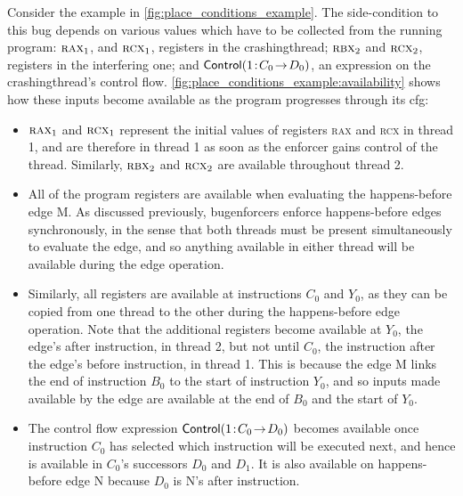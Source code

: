 Consider the example in \autoref{fig:place_conditions_example}.  The
side-condition to this bug depends on various values which have to be
collected from the running program: $\textsc{rax}_1$, and
$\textsc{rcx}_1$, registers in the \gls{crashingthread};
$\textsc{rbx}_2$ and $\textsc{rcx}_2$, registers in the interfering
one; and ${\mathsf{Control}}(\mathrm{1}\!:\!C_0\!\rightarrow\!D_0)$, an expression on the
\gls{crashingthread}'s control flow.
\autoref{fig:place_conditions_example:availability} shows how these
inputs become available as the program progresses through its
\gls{cfg}:
\begin{itemize}
\item $\textsc{rax}_1$ and $\textsc{rcx}_1$ represent the initial
  values of registers \textsc{rax} and \textsc{rcx} in thread 1, and
  are therefore in thread 1 as soon as the enforcer gains control of
  the thread.  Similarly, $\textsc{rbx}_2$ and $\textsc{rcx}_2$ are
  available throughout thread 2.
\item All of the program registers are available when evaluating the
  happens-before edge M.  As discussed previously, {\technique}
  \glspl{bugenforcer} enforce happens-before edges synchronously, in
  the sense that both threads must be present simultaneously to
  evaluate the edge, and so anything available in either thread will
  be available during the edge operation.
\item Similarly, all registers are available at instructions $C_0$ and
  $Y_0$, as they can be copied from one thread to the other during the
  happens-before edge operation.  Note that the additional registers
  become available at $Y_0$, the edge's after instruction, in thread
  2, but not until $C_0$, the instruction after the edge's before
  instruction, in thread 1.  This is because the edge M links the end
  of instruction $B_0$ to the start of instruction $Y_0$, and so
  inputs made available by the edge are available at the end of $B_0$
  and the start of $Y_0$.
\item The control flow expression ${\mathsf{Control}}(\mathrm{1}\!:\!C_0\!\rightarrow\!D_0)$ becomes
  available once instruction $C_0$ has selected which instruction will
  be executed next, and hence is available in $C_0$'s successors $D_0$
  and $D_1$.  It is also available on happens-before edge N because
  $D_0$ is N's after instruction.
\end{itemize}
